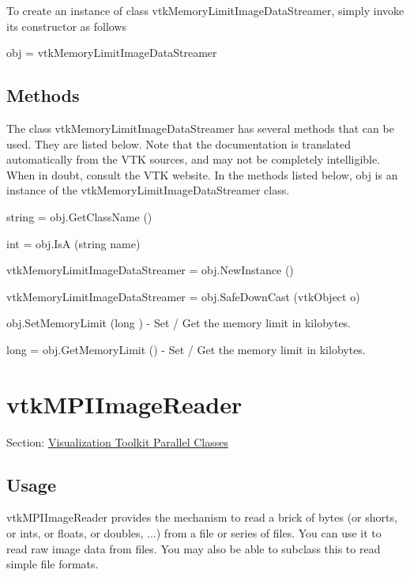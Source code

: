To create an instance of class vtk\-Memory\-Limit\-Image\-Data\-Streamer, simply invoke its constructor as follows \begin{DoxyVerb}  obj = vtkMemoryLimitImageDataStreamer
\end{DoxyVerb}
 \hypertarget{vtkwidgets_vtkxyplotwidget_Methods}{}\subsection{Methods}\label{vtkwidgets_vtkxyplotwidget_Methods}
The class vtk\-Memory\-Limit\-Image\-Data\-Streamer has several methods that can be used. They are listed below. Note that the documentation is translated automatically from the V\-T\-K sources, and may not be completely intelligible. When in doubt, consult the V\-T\-K website. In the methods listed below, {\ttfamily obj} is an instance of the vtk\-Memory\-Limit\-Image\-Data\-Streamer class. 
\begin{DoxyItemize}
\item {\ttfamily string = obj.\-Get\-Class\-Name ()}  
\item {\ttfamily int = obj.\-Is\-A (string name)}  
\item {\ttfamily vtk\-Memory\-Limit\-Image\-Data\-Streamer = obj.\-New\-Instance ()}  
\item {\ttfamily vtk\-Memory\-Limit\-Image\-Data\-Streamer = obj.\-Safe\-Down\-Cast (vtk\-Object o)}  
\item {\ttfamily obj.\-Set\-Memory\-Limit (long )} -\/ Set / Get the memory limit in kilobytes.  
\item {\ttfamily long = obj.\-Get\-Memory\-Limit ()} -\/ Set / Get the memory limit in kilobytes.  
\end{DoxyItemize}\hypertarget{vtkparallel_vtkmpiimagereader}{}\section{vtk\-M\-P\-I\-Image\-Reader}\label{vtkparallel_vtkmpiimagereader}
Section\-: \hyperlink{sec_vtkparallel}{Visualization Toolkit Parallel Classes} \hypertarget{vtkwidgets_vtkxyplotwidget_Usage}{}\subsection{Usage}\label{vtkwidgets_vtkxyplotwidget_Usage}
vtk\-M\-P\-I\-Image\-Reader provides the mechanism to read a brick of bytes (or shorts, or ints, or floats, or doubles, ...) from a file or series of files. You can use it to read raw image data from files. You may also be able to subclass this to read simple file formats.

